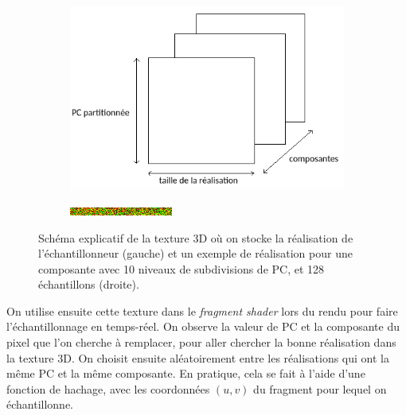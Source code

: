 \begin{figure}
    \centering
    \begin{subfigure}{.5\textwidth}
        \centering
        \includegraphics[width=\textwidth]{contenu/resources/images/sampler_realization}
    \end{subfigure}
    \hfill
    \begin{subfigure}{.45\textwidth}
        \centering
        \includegraphics[width=\textwidth]{contenu/resources/images/realization_pc_0}
    \end{subfigure}

    \caption[Réalisation de l'échantillonneur préférentiel]{Schéma explicatif de la texture 3D où on stocke la réalisation de l'échantillonneur (gauche) et un exemple de réalisation pour une composante avec 10 niveaux de subdivisions de PC, et 128 échantillons (droite).}
    \label{fig:sampler-realization}
\end{figure}

On utilise ensuite cette texture dans le \textit{fragment shader} lors du rendu pour faire l'échantillonnage en temps-réel. On observe la valeur de PC et la composante du pixel que l'on cherche à remplacer, pour aller chercher la bonne réalisation dans la texture 3D. On choisit ensuite aléatoirement entre les réalisations qui ont la même PC et la même composante. En pratique, cela se fait à l'aide d'une fonction de hachage, avec les coordonnées $(u, v)$ du fragment pour lequel on échantillonne.

